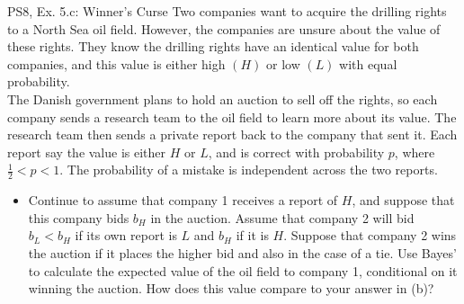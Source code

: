 \begin{frame}{PS8, Ex. 5.c: Winner's Curse}
      Two companies want to acquire the drilling rights to a North Sea oil field. However, the companies are unsure about the value of these rights. They know the drilling rights have an identical value for both companies, and this value is either high $(H)$ or low $(L)$ with equal probability.\\\smallskip
      The Danish government plans to hold an auction to sell off the rights, so each company sends a research team to the oil field to learn more about its value. The research team then sends a private report back to the company that sent it. Each report say the value is either $H$ or $L$, and is correct with probability $p$, where $\frac{1}{2} < p < 1$. The probability of a mistake is independent across the two reports.
      \vspace{-2pt}
      \begin{itemize}
        \item[(c)] Continue to assume that company 1 receives a report of $H$, and suppose that this company bids $b_H$ in the auction. Assume that company 2 will bid $b_L < b_H$ if its own report is $L$ and $b_H$ if it is $H$. Suppose that company 2 wins the auction if it places the higher bid and also in the case of a tie. Use Bayes’ to calculate the expected value of the oil field to company 1, conditional on it winning the auction. How does this value compare to your answer in (b)?
        \end{itemize}
      \vfill\null
\end{frame}

